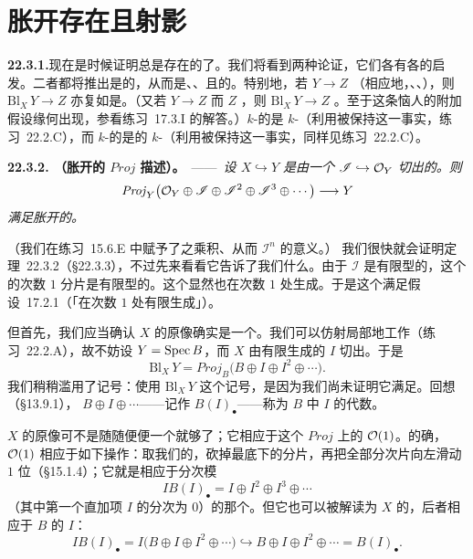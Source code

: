 
\section{胀开存在且射影}

\textbf{22.3.1.}\quad 现在是时候证明\trBlowup{}总是存在的了。我们将看到两种论证，它们各有各的启发。二者都将推出\trBlowup{}\trMorphism{}是\trProjective{}的，从而是\trQuasicompact、\trProper、\trFiniteType{}且\trSeparated{}的。特别地，若 $Y\to Z$ \trQuasicompact（相应地，\trProper、\trFiniteType、\trSeparated），则 $\mathrm{Bl}_X\,Y\to Z$ 亦复如是。（又若 $Y\to Z$ \trProjective{}而 $Z$ \trQuasicompact，则 $\mathrm{Bl}_X\,Y\to Z$ \trProjective。至于这条恼人的附加假设缘何出现，参看\mbox{练习~17.3.I} 的解答。）$k$-\trVariety{}的\trBlowup{}是 $k$-\trVariety（利用\trReducedness{}被保持这一事实，\mbox{练习~22.2.C}），而\trIrreducible{} $k$-\trVariety{}的\trBlowup{}是\trIrreducible{}的 $k$-\trVariety（利用\trIrreducibility{}被保持这一事实，同样见\mbox{练习~22.2.C}）。

\textbf{22.3.2. \trhTheorem（胀开的 $\mathit{Proj}$ 描述）。}\ ——\ \emph{设 $X\hookrightarrow Y$ 是由一个\trFiniteType\trQC\trIdealSheaf{} $\mathscr{I}\hookrightarrow\mathcal{O}_Y$ 切出的\trClosedSubscheme。则}
\[
\mathit{Proj}_Y\bigl(\mathcal{O}_Y\oplus\mathscr{I}\oplus\mathscr{I}^2\oplus\mathscr{I}^3\oplus\cdots\bigr)\longrightarrow Y
\]
\emph{满足胀开的\trUniversalProperty。}

（我们在\mbox{练习~15.6.E} 中赋予了\trIdealSheaf{}之乘积、从而 $\mathscr{I}^n$ 的意义。）
我们很快就会证明\mbox{定理~22.3.2}（\S22.3.3），不过先来看看它告诉了我们什么。由于 $\mathscr{I}$ 是有限型的，这个\trSheafOfGradedAlgebras{}的次数 $1$ 分片是有限型的。这个\trSheafOfGradedAlgebras{}显然也在次数 $1$ 处生成。于是这个\trSheafOfAlgebras{}满足\mbox{假设~17.2.1}（「在次数 $1$ 处有限生成」）。

但首先，我们应当确认 $X$ 的原像确实是一个\trEffectiveCartierDivisor。我们可以仿射局部地工作（\mbox{练习~22.2.A}），故不妨设 $Y=\operatorname{Spec} B$，而 $X$ 由有限生成的\trIdeal{} $I$ 切出。于是
\[
\mathrm{Bl}_X\,Y=\mathit{Proj}_B\bigl(B\oplus I\oplus I^2\oplus\cdots\bigr).
\]
我们稍稍滥用了记号：使用 $\mathrm{Bl}_X\,Y$ 这个记号，是因为我们尚未证明它满足\trUniversalProperty。回想（\S13.9.1），\trGradedRing{} $B\oplus I\oplus\cdots$——记作 $B(I)_\bullet$——称为 $B$ 中\trIdeal{} $I$ 的\trRees{}代数。

$X$ 的原像可不是随随便便一个\trEffectiveCartierDivisor{}就够了；它相应于这个 $\mathit{Proj}$ 上的\trInvertibleSheaf{} $\mathcal{O}(1)$。的确，$\mathcal{O}(1)$ 相应于如下操作：取我们的\trGradedRing，砍掉最底下的分片，再把全部分次片向左滑动 $1$ 位（\S15.1.4）；它就是相应于分次模
\[
IB(I)_\bullet=I\oplus I^2\oplus I^3\oplus\cdots
\]
（其中第一个直加项 $I$ 的分次为 $0$）的那个\trInvertibleSheaf。但它也可以被解读为 $X$ 的\trSchemeTheoreticPreimage，后者相应于 $B$ 的\trIdeal{} $I$：
\[
IB(I)_\bullet=I\bigl(B\oplus I\oplus I^2\oplus\cdots\bigr)\hookrightarrow B\oplus I\oplus I^2\oplus\cdots=B(I)_\bullet.
\]

